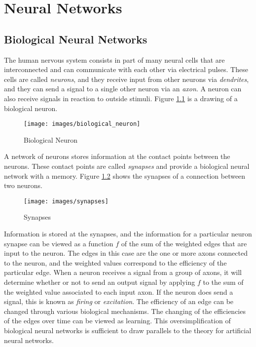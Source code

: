 \chapter[Neural Networks]{Neural Networks}

\section{Biological Neural Networks}

The human nervous system consists in part of many neural cells that are interconnected and can communicate with each other via electrical pulses.
These cells are called {\it neurons}, and they receive input from other neurons via {\it dendrites}, and they can send a signal to a single other neuron via an {\it axon}.
A neuron can also receive signals in reaction to outside stimuli.
Figure \ref{biological_neuron} is a drawing of a biological neuron. 

\begin{figure}[h!]
  \centering
  \texttt{[image: images/biological\_neuron]}
  \caption{Biological Neuron}
  \label{biological_neuron}
\end{figure}

A network of neurons stores information at the contact points between the neurons.
These contact points are called {\it synapses} and provide a biological neural network with a memory.
Figure \ref{synapses} shows the synapses of a connection between two neurons.

\begin{figure}[h!]
  \centering
  \texttt{[image: images/synapses]}
  \caption{Synapses}
  \label{synapses}
\end{figure}

Information is stored at the synapses, and the information for a particular neuron synapse can be viewed as a function $f$ of the sum of the weighted edges that are input to the neuron.
The edges in this case are the one or more axons connected to the
neuron, and the weighted values correspond to the efficiency of the particular edge. 
When a neuron receives a signal from a group of axons, it will determine whether or not to send an output signal by applying $f$ to the sum of the weighted value associated to each input axon.
If the neuron does send a signal, this is known as {\it firing} or {\it excitation}.
The efficiency of an edge can be changed through various biological mechanisms.
The changing of the efficiencies of the edges over time can be viewed as learning.
This oversimplification of biological neural networks is sufficient to draw parallels to the theory for artificial neural networks.

